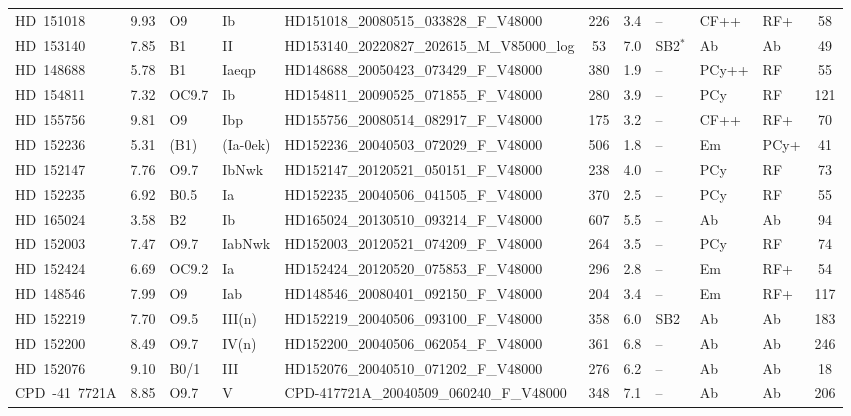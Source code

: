 {\begin{landscape}
\begin{longtable}{lclllcclllc}
\noalign{\smallskip}
HD~151018 & 9.93 & O9 & Ib & HD151018\_20080515\_033828\_F\_V48000 & 226 & 3.4 & -- & CF++ & RF+ & 58 \\
\noalign{\smallskip}
HD~153140 & 7.85 & B1 & II & HD153140\_20220827\_202615\_M\_V85000\_log & 53 & 7.0 & SB2$^{*}$ & Ab & Ab & 49 \\
\noalign{\smallskip}
HD~148688 & 5.78 & B1 & Iaeqp & HD148688\_20050423\_073429\_F\_V48000 & 380 & 1.9 & -- & PCy++ & RF & 55 \\
\noalign{\smallskip}
HD~154811 & 7.32 & OC9.7 & Ib & HD154811\_20090525\_071855\_F\_V48000 & 280 & 3.9 & -- & PCy & RF & 121 \\
\noalign{\smallskip}
HD~155756 & 9.81 & O9 & Ibp & HD155756\_20080514\_082917\_F\_V48000 & 175 & 3.2 & -- & CF++ & RF+ & 70 \\
\noalign{\smallskip}
HD~152236 & 5.31 & (B1) & (Ia-0ek) & HD152236\_20040503\_072029\_F\_V48000 & 506 & 1.8 & -- & Em & PCy+ & 41 \\
\noalign{\smallskip}
HD~152147 & 7.76 & O9.7 & IbNwk & HD152147\_20120521\_050151\_F\_V48000 & 238 & 4.0 & -- & PCy & RF & 73 \\
\noalign{\smallskip}
HD~152235 & 6.92 & B0.5 & Ia & HD152235\_20040506\_041505\_F\_V48000 & 370 & 2.5 & -- & PCy & RF & 55 \\
\noalign{\smallskip}
HD~165024 & 3.58 & B2 & Ib & HD165024\_20130510\_093214\_F\_V48000 & 607 & 5.5 & -- & Ab & Ab & 94 \\
\noalign{\smallskip}
HD~152003 & 7.47 & O9.7 & IabNwk & HD152003\_20120521\_074209\_F\_V48000 & 264 & 3.5 & -- & PCy & RF & 74 \\
\noalign{\smallskip}
HD~152424 & 6.69 & OC9.2 & Ia & HD152424\_20120520\_075853\_F\_V48000 & 296 & 2.8 & -- & Em & RF+ & 54 \\
\noalign{\smallskip}
HD~148546 & 7.99 & O9 & Iab & HD148546\_20080401\_092150\_F\_V48000 & 204 & 3.4 & -- & Em & RF+ & 117 \\
\noalign{\smallskip}
HD~152219 & 7.70 & O9.5 & III(n) & HD152219\_20040506\_093100\_F\_V48000 & 358 & 6.0 & SB2 & Ab & Ab & 183 \\
\noalign{\smallskip}
HD~152200 & 8.49 & O9.7 & IV(n) & HD152200\_20040506\_062054\_F\_V48000 & 361 & 6.8 & -- & Ab & Ab & 246 \\
\noalign{\smallskip}
HD~152076 & 9.10 & B0/1 & III & HD152076\_20040510\_071202\_F\_V48000 & 276 & 6.2 & -- & Ab & Ab & 18 \\
\noalign{\smallskip}
CPD~-41~7721A & 8.85 & O9.7 & V & CPD-417721A\_20040509\_060240\_F\_V48000 & 348 & 7.1 & -- & Ab & Ab & 206 \\

\end{longtable}
\end{landscape}}
